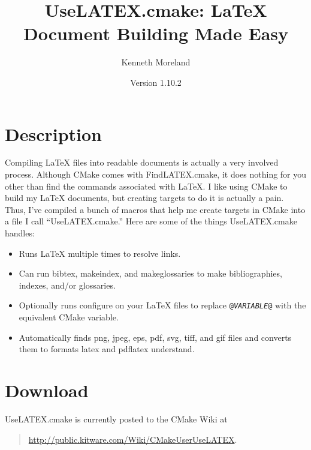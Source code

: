 \documentclass{article}
\newcommand{\UseLATEXVersion}{1.10.2}
\newcommand*{\textfile}[1]{\textsf{#1}}
\newcommand*{\textprog}[1]{\textfile{#1}}
\newcommand*{\textcmake}[1]{\texttt{#1}}
\newcommand*{\textvar}[1]{\textit{#1}}
\newcommand*{\UseLATEX}{\textfile{UseLATEX.cmake}\xspace}
\newcommand*{\latex}{\LaTeX\xspace}
\begin{document}
  \sloppy

  \title{UseLATEX.cmake: \latex Document Building Made Easy}
  \author{Kenneth Moreland}
  \date{Version \UseLATEXVersion}
  \maketitle

  \tableofcontents


  \section{Description}
  \label{sec:Description}

  Compiling \latex files into readable documents is actually a very
  involved process. Although CMake comes with \textfile{FindLATEX.cmake},
  it does nothing for you other than find the commands associated with
  \latex. I like using CMake to build my \latex documents, but creating
  targets to do it is actually a pain. Thus, I've compiled a bunch of
  macros that help me create targets in CMake into a file I call
  ``\UseLATEX.'' Here are some of the things \UseLATEX handles:

  \begin{itemize}
  \item Runs \latex multiple times to resolve links. 
  \item Can run \textprog{bibtex}, \textprog{makeindex}, and
    \textprog{makeglossaries} to make bibliographies, indexes, and/or
    glossaries.
  \item Optionally runs configure on your \latex files to replace
    \textcmake{@\textvar{VARIABLE}@} with the equivalent CMake variable.
  \item Automatically finds png, jpeg, eps, pdf, svg, tiff, and gif files
    and converts them to formats \textprog{latex} and \textprog{pdflatex}
    understand.
  \end{itemize}


  \section{Download}
  \label{sec:Download}

  \UseLATEX is currently posted to the CMake Wiki at
  \begin{quote}
    \href{http://public.kitware.com/Wiki/CMakeUserUseLATEX}{http://public.kitware.com/Wiki/CMakeUserUseLATEX}.
  \end{quote}
\end{document}
